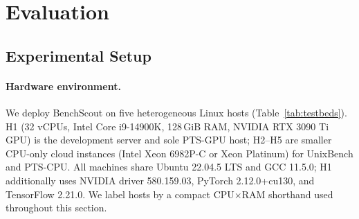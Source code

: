 \documentclass[sigplan,10pt]{acmart}
\newcommand{\ourmethod}{\textsc{BenchScout}\xspace}
\newcommand{\ptscpu}{PTS-CPU}
\newcommand{\ptsgpu}{PTS-GPU}
\newcommand{\appname}{BenchScout}
\begin{document}
\section{Evaluation}
\label{sec:evaluation}

\subsection{Experimental Setup}
\label{subsec:exp-setup}





\paragraph{Hardware environment.}

We deploy \appname{} on five heterogeneous Linux hosts (Table~\ref{tab:testbeds}).
H1 (32 vCPUs, Intel Core i9-14900K, 128\,GiB RAM, NVIDIA RTX 3090 Ti GPU) is the development server and sole \ptsgpu{} host; H2--H5 are smaller CPU-only cloud instances (Intel Xeon 6982P-C or Xeon Platinum) for UnixBench and \ptscpu{}.
All machines share Ubuntu 22.04.5 LTS and GCC 11.5.0; H1 additionally uses NVIDIA driver 580.159.03, PyTorch 2.12.0+cu130, and TensorFlow 2.21.0.
We label hosts by a compact CPU$\times$RAM shorthand used throughout this section.
\end{document}

